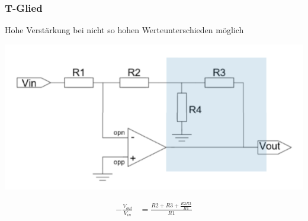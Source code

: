 \subsubsection{T-Glied}
Hohe Verstärkung bei nicht so hohen Werteunterschieden möglich\\
\begin{minipage}{0.20\textwidth}
	\includegraphics[width=\linewidth,keepaspectratio=true]{./Images/opamp_t-glied}
\end{minipage}%
\begin{minipage}{0.30\textwidth}
	\begin{align*}
		-\frac{V_{out}}{V_{in}} &= \frac{R2+R3+\frac{R2R3}{R4}}{R1}
	\end{align*}
\end{minipage}


